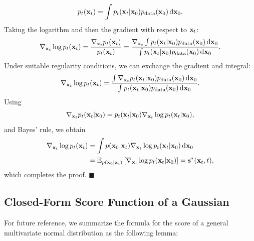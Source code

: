 \begin{align*}
p_t({\mathbf{x}}_t) 
= \int p_t({\mathbf{x}}_t | {\mathbf{x}}_0) 
p_{\text{data}}({\mathbf{x}}_0)   \mathop{}\!\mathrm{d}{\mathbf{x}}_0.
\end{align*}
Taking the logarithm and then the gradient with respect to ${\mathbf{x}}_t$:
\begin{align*}
\nabla_{{\mathbf{x}}_t} \log p_t({\mathbf{x}}_t) 
= \frac{\nabla_{{\mathbf{x}}_t} p_t({\mathbf{x}}_t)}{p_t({\mathbf{x}}_t)}
= \frac{\nabla_{{\mathbf{x}}_t} \int p_t({\mathbf{x}}_t | {\mathbf{x}}_0) 
p_{\text{data}}({\mathbf{x}}_0)   \mathop{}\!\mathrm{d}{\mathbf{x}}_0}
{\int p_t({\mathbf{x}}_t | {\mathbf{x}}_0) 
p_{\text{data}}({\mathbf{x}}_0)   \mathop{}\!\mathrm{d}{\mathbf{x}}_0}.
\end{align*}
Under suitable regularity conditions, we can exchange the gradient and integral:
\begin{align*}
\nabla_{{\mathbf{x}}_t} \log p_t({\mathbf{x}}_t) 
= \frac{\int \nabla_{{\mathbf{x}}_t} p_t({\mathbf{x}}_t | {\mathbf{x}}_0) 
p_{\text{data}}({\mathbf{x}}_0)   \mathop{}\!\mathrm{d}{\mathbf{x}}_0}
{\int p_t({\mathbf{x}}_t | {\mathbf{x}}_0) 
p_{\text{data}}({\mathbf{x}}_0)   \mathop{}\!\mathrm{d}{\mathbf{x}}_0}.
\end{align*}
Using
\[
\nabla_{{\mathbf{x}}_t}p_t({\mathbf{x}}_t|{\mathbf{x}}_0)
=
p_t({\mathbf{x}}_t|{\mathbf{x}}_0)
\nabla_{{\mathbf{x}}_t}\log p_t({\mathbf{x}}_t|{\mathbf{x}}_0),
\]
and Bayes' rule, we obtain
\begin{align*}
\nabla_{{\mathbf{x}}_t}\log p_t({\mathbf{x}}_t)
&=
\int
p({\mathbf{x}}_0|{\mathbf{x}}_t)
\nabla_{{\mathbf{x}}_t}\log p_t({\mathbf{x}}_t|{\mathbf{x}}_0)
\mathop{}\!\mathrm{d}{\mathbf{x}}_0 \\
&=
\mathbb{E}_{p({\mathbf{x}}_0|{\mathbf{x}}_t)}
\left[
\nabla_{{\mathbf{x}}_t}\log p_t({\mathbf{x}}_t|{\mathbf{x}}_0)
\right]
=
\mathbf{s}^*({\mathbf{x}}_t,t),
\end{align*}
which completes the proof.
\hfill$\blacksquare$



\subsection{Closed-Form Score Function of a Gaussian}

For future reference, we summarize the formula for the score of a general multivariate normal distribution as the following lemma:


